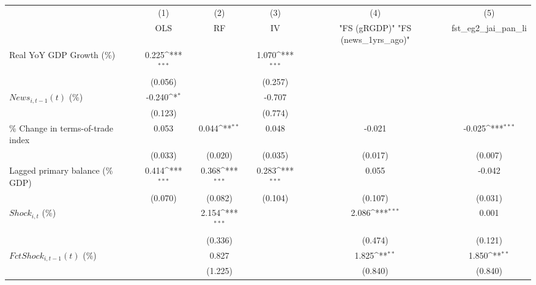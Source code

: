 {
\def\sym#1{\ifmmode^{#1}\else\(^{#1}\)\fi}
\begin{tabular}{l*{5}{c}}
\toprule
                    &\multicolumn{1}{c}{(1)}&\multicolumn{1}{c}{(2)}&\multicolumn{1}{c}{(3)}&\multicolumn{1}{c}{(4)}&\multicolumn{1}{c}{(5)}\\
                    &\multicolumn{1}{c}{OLS}&\multicolumn{1}{c}{RF}&\multicolumn{1}{c}{IV}&\multicolumn{1}{c}{ "FS (gRGDP)"  "FS (news_1yrs_ago)" }&\multicolumn{1}{c}{fst_eg2_jai_pan_li}\\
\midrule
Real YoY GDP Growth (\%)&       0.225\sym{***}&                     &       1.070\sym{***}&                     &                     \\
                    &     (0.056)         &                     &     (0.257)         &                     &                     \\
\addlinespace
$ News_{i,t-1}(t)$ (\%)&      -0.240\sym{*}  &                     &      -0.707         &                     &                     \\
                    &     (0.123)         &                     &     (0.774)         &                     &                     \\
\addlinespace
\% Change in terms-of-trade index&       0.053         &       0.044\sym{**} &       0.048         &      -0.021         &      -0.025\sym{***}\\
                    &     (0.033)         &     (0.020)         &     (0.035)         &     (0.017)         &     (0.007)         \\
\addlinespace
Lagged primary balance (\% GDP)&       0.414\sym{***}&       0.368\sym{***}&       0.283\sym{***}&       0.055         &      -0.042         \\
                    &     (0.070)         &     (0.082)         &     (0.104)         &     (0.107)         &     (0.031)         \\
\addlinespace
$ Shock_{i,t}$ (\%) &                     &       2.154\sym{***}&                     &       2.086\sym{***}&       0.001         \\
                    &                     &     (0.336)         &                     &     (0.474)         &     (0.121)         \\
\addlinespace
$ FctShock_{i,t-1}(t)$ (\%)&                     &       0.827         &                     &       1.825\sym{**} &       1.850\sym{**} \\
                    &                     &     (1.225)         &                     &     (0.840)         &     (0.840)         \\

\end{tabular}}
